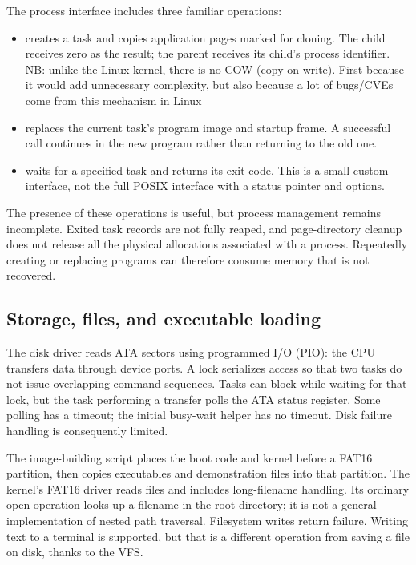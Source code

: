 \documentclass[11pt,a4paper]{scrartcl}
\newcommand{\code}[1]{\texttt{\detokenize{#1}}}
\begin{document}
The process interface includes three familiar operations:
\begin{itemize}
  \item \code{fork} creates a task and copies application pages marked for
  cloning. The child receives zero as the result; the parent receives its
  child's process identifier. NB: unlike the Linux kernel, there is no COW
  (copy on write). First because it would add unnecessary complexity, but
  also because a lot of bugs/CVEs come from this mechanism in Linux \cite{cow-cve}
  \item \code{exec} replaces the current task's program image and startup
  frame. A successful call continues in the new program rather than
  returning to the old one.
  \item \code{waitpid} waits for a specified task and returns its exit
  code. This is a small custom interface, not the full POSIX interface
  with a status pointer and options.
\end{itemize}

The presence of these operations is useful, but process management remains
incomplete. Exited task records are not fully reaped, and page-directory
cleanup does not release all the physical allocations associated with a
process. Repeatedly creating or replacing programs can therefore consume
memory that is not recovered.

\subsection{Storage, files, and executable loading}

The disk driver reads ATA sectors using programmed I/O (PIO): the CPU
transfers data through device ports. A lock serializes access so that two
tasks do not issue overlapping command sequences. Tasks can block while
waiting for that lock, but the task performing a transfer polls the ATA
status register. Some polling has a timeout; the initial busy-wait helper
has no timeout. Disk failure handling is consequently limited.

The image-building script places the boot code and kernel before a FAT16
partition, then copies executables and demonstration files into that
partition. The kernel's FAT16 driver reads files and includes long-filename
handling. Its ordinary open operation looks up a filename in the root
directory; it is not a general implementation of nested path traversal.
Filesystem writes return failure. Writing text to a terminal is supported,
but that is a different operation from saving a file on disk, thanks to the VFS.
\end{document}

